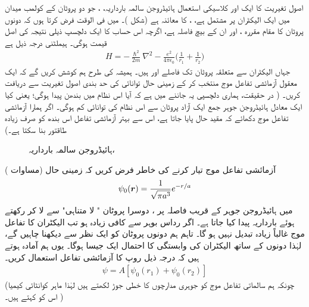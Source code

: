  اصول تغیریت کا ایک اور کلاسیکی استعمال ہائیڈروجن سالمہ بارداریہ،    ، جو  دو پروٹان کے کولمب میدان میں ایک الیکٹران پر مشتمل ہے، ،   کا معائنہ ہے  (شکل )۔  میں فی الوقت فرض کرتا ہوں کہ دونوں پروٹان کا مقام  مقررہ ،  اور ان کے بیچ فاصلہ  ہے،  اگرچہ اس حساب کا ایک دلچسپ ذیلی نتیجہ  کی اصل قیمت ہوگی۔ ہیملٹنی درجہ ذیل ہے
 \begin{align}\label{مساوات_تغیریت_ہائیڈروجن_ہیملٹنی}
H=-\frac{\hslash^{2}}{2m}\nabla^{2}-\frac{e^{2}}{4\pi\epsilon_{0}}\big(\frac{1}{r_{1}}+\frac{1}{r_{2}}\big)
\end{align}
 جہاں الیکٹران سے متعلقہ پروٹان تک فاصلے  اور  ہیں۔ ہمیشہ کی طرح ہم کوشش کریں گے کہ ایک معقول   آزمائشی  تفاعل موج  منتخب  کر کے زمینی حال توانائی کی حد بندی اصول تغیریت سے دریافت کریں۔ ( در حقیقت،  ہماری دلچسپی یہ جاننے میں ہے  کہ آیا اس نظام میں بندھن  پیدا ہوگی؛  یعنی کیا  ایک معادل ہائیڈروجن جوہر جمع ایک آزاد پروٹان سے  اس نظام کی توانائی کم ہوگی۔ اگر ہمارا آزمائشی  تفاعل موج دکھائے کہ  مقید حال پایا جاتا ہے،  اس سے  بہتر آزمائشی  تفاعل اس بندھ  کو صرف زیادہ  طاقتور بنا سکتا ہے۔)
\begin{figure} \centering
{} 
\caption{ہائیڈروجن سالمہ بارداریہ، } 
\label{شکل_تغیریت_ہائیڈروجن_سالمہ_بارداریہ} 
\end{figure} 

 آزمائشی تفاعل موج تیار کرنے کی خاطر فرض کریں کہ  زمینی حال  (مساوات )
\begin{align}
\psi_{0}({{\boldsymbol{r}}})=\frac{1}{\sqrt{\pi a^{3}}}e^{-r/a} 
\end{align}
  میں  ہائیڈروجن جوہر کے قریب  فاصلہ  پر ،   دوسرا پروٹان "    لا متناہی" سے  لا کر رکھتے ہوئے   بارداریہ پیدا کیا جاتا ہے۔ اگر رداس بوہر سے  کافی زیادہ  ہو تب الیکٹران کا تفاعل موج غالباً زیادہ تبدیل نہیں ہو گا۔ تاہم ہم دونوں پروٹان کو ایک نظر سے دیکھنا  چاہیں گے،  لہٰذا دونوں  کے ساتھ الیکٹران کی وابستگی کا احتمال ایک  جیسا ہوگا۔ یوں ہم آمادہ ہوتے ہیں  کہ  درجہ ذیل روپ کا آزمائشی تفاعل استعمال کریں۔ 
 \begin{align}\label{مساوات_تغیریت_آزمائشی_تفاعل}
\psi=A[\psi_{0}(r_{1})+\psi_{0}(r_{2})]
\end{align}
(چونکہ ہم سالماتی    تفاعل موج کو جوہری مدارچوں کا خطی جوڑ لکھتے ہیں لہٰذا ماہر کوانٹائی  کیمیا اس  کو  کہتے ہیں۔ )

